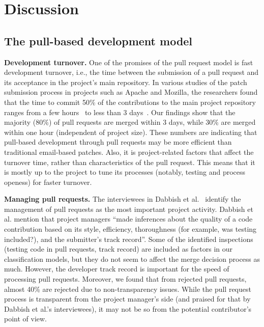 \documentclass{sig-alternate}
\begin{document}
\section{Discussion}
\label{sec:discussion}

\subsection{The pull-based development model}

\textbf{Development turnover.} One of the promises of the pull request model is
fast development turnover, i.e., the time between the submission of a pull
request and its acceptance in the project's main repository. In various studies
of the patch submission process in projects such as Apache and Mozilla, the
researchers found that the time to commit 50\% of the contributions to the main
project repository ranges from a few hours~\cite{Rigby08} to less than 3
days~\cite{Weiss08, Baysa12}. Our findings show that the majority (80\%) of pull
requests are merged within 3 days, while 30\% are
merged within one hour (independent of project size). These numbers are
indicating that pull-based development through pull requests may be more
efficient than traditional email-based patches.  Also, it is project-related
factors that affect the turnover time, rather than characteristics of the pull
request. This means that it is mostly up to the project to tune its processes
(notably, testing and process openess) for faster turnover.

\textbf{Managing pull requests.} The interviewees in Dabbish et
al.~\cite{Dabbi13} identify the management of pull requests as the most
important project activity. Dabbish et al. mention that project managers ``made
inferences about the quality of a code contribution based on its style,
efficiency, thoroughness (for example, was testing included?), and the
submitter's track record''. Some of the identified inspections (testing code in
pull requests, track record) are included as factors in our classification
models, but they do not seem to affect the merge decision process as much.
However, the developer track record is important for the speed of processing
pull requests. Moreover, we found that from rejected pull requests, almost 40\%
are rejected due to non-transparency issues. While the pull request process is
transparent from the project manager's side (and praised for that by Dabbish et
al.'s interviewees), it may not be so from the potential contributor's point of
view.
\end{document}
